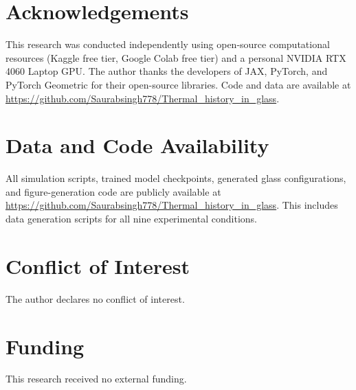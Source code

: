\documentclass[12pt,a4paper]{article}
\begin{document}
\section*{Acknowledgements}

This research was conducted independently using open-source computational resources (Kaggle free tier, Google Colab free tier) and a personal NVIDIA RTX 4060 Laptop GPU.
The author thanks the developers of JAX, PyTorch, and PyTorch Geometric for their open-source libraries.
Code and data are available at \url{https://github.com/Saurabsingh778/Thermal_history_in_glass}.

\section*{Data and Code Availability}

All simulation scripts, trained model checkpoints, generated glass configurations, and figure-generation code are publicly available at \url{https://github.com/Saurabsingh778/Thermal_history_in_glass}.
This includes data generation scripts for all nine experimental conditions.

\section*{Conflict of Interest}

The author declares no conflict of interest.

\section*{Funding}

This research received no external funding.
\end{document}
